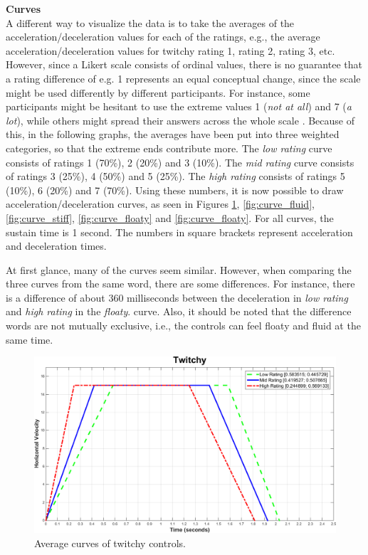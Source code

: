 \textbf{Curves}\\
A different way to visualize the data is to take the averages of the acceleration/deceleration values for each of the ratings, e.g., the average acceleration/deceleration values for twitchy rating 1, rating 2, rating 3, etc. However, since a Likert scale consists of ordinal values, there is no guarantee that a rating difference of e.g. 1 represents an equal conceptual change, since the scale might be used differently by different participants. For instance, some participants might be hesitant to use the extreme values 1 (\textit{not at all}) and 7 (\textit{a lot}), while others might spread their answers across the whole scale \cite{cunningham}. Because of this, in the following graphs, the averages have been put into three weighted categories, so that the extreme ends contribute more. The \textit{low rating} curve consists of ratings 1 (70\%), 2 (20\%) and 3 (10\%). The \textit{mid rating} curve consists of ratings 3 (25\%), 4 (50\%) and 5 (25\%). The \textit{high rating} consists of ratings 5 (10\%), 6 (20\%) and 7 (70\%). Using these numbers, it is now possible to draw acceleration/deceleration curves, as seen in Figures \ref{fig:curve_twitchy}, \ref{fig:curve_fluid}, \ref{fig:curve_stiff}, \ref{fig:curve_floaty} and \ref{fig:curve_floaty}. For all curves, the sustain time is 1 second. The numbers in square brackets represent acceleration and deceleration times.

At first glance, many of the curves seem similar. However, when comparing the three curves from the same word, there are some differences. For instance, there is a difference of about 360 milliseconds between the deceleration in \textit{low rating} and \textit{high rating} in the \textit{floaty}. curve. Also, it should be noted that the difference words are not mutually exclusive, i.e., the controls can feel floaty and fluid at the same time.

\begin{figure}[htbp]
\centering
\includegraphics[width=0.9\columnwidth]{Pics/Curves/Twitchy_curve}
\caption{Average curves of twitchy controls.}
\label{fig:curve_twitchy}
\end{figure}

